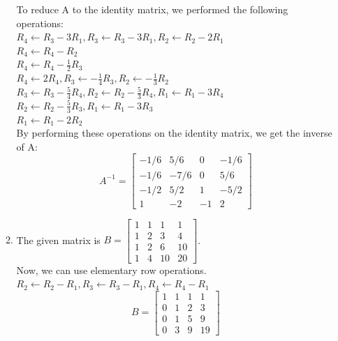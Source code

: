 \documentclass[a4paper]{article}
\begin{document}
\begin{enumerate}
\begin{enumerate}
            To reduce A to the identity matrix, we performed the following operations: \\
            $R_4 \leftarrow R_3 - 3R_1, R_3 \leftarrow R_3 - 3R_1, R_2 \leftarrow R_2 - 2R_1$\\
            $R_4 \leftarrow R_4 - R_2$\\
            $R_4 \leftarrow R_4 - \frac{1}{2}R_3$\\
            $R_4 \leftarrow 2R_4, R_3 \leftarrow -\frac{1}{4}R_3, R_2 \leftarrow -\frac{1}{3}R_2$\\
            $R_3 \leftarrow R_3 - \frac{5}{4}R_4, R_2 \leftarrow R_2 - \frac{5}{3}R_4, R_1 \leftarrow R_1 - 3R_4$\\
            $R_2 \leftarrow R_2 - \frac{5}{3}R_3, R_1 \leftarrow R_1 - 3R_3$\\
            $R_1 \leftarrow R_1 - 2R_2$\\

            By performing these operations on the identity matrix, we get the inverse of A: 
            \[A^{-1} = \begin{bmatrix} -1/6 & 5/6 & 0 & -1/6 \\ -1/6 & -7/6 & 0 & 5/6 \\ -1/2 & 5/2 & 1 & -5/2 \\ 1 & -2 & -1 & 2 \end{bmatrix}\]


            \item The given matrix is \(B = \begin{bmatrix} 1 & 1 & 1 & 1 \\ 1 & 2 & 3 & 4 \\ 1 & 2 & 6 & 10 \\ 1 & 4 & 10 & 20 \end{bmatrix}\).\\

            Now, we can use elementary row operations. \\
            $R_2 \leftarrow R_2 - R_1, R_3 \leftarrow R_3 - R_1, R_4 \leftarrow R_4 - R_1$\\
            \[B = \begin{bmatrix} 1 & 1 & 1 & 1 \\ 0 & 1 & 2 & 3 \\ 0 & 1 & 5 & 9 \\ 0 & 3 & 9 & 19 \end{bmatrix}\]


\end{enumerate}
\end{enumerate}
\end{document}
